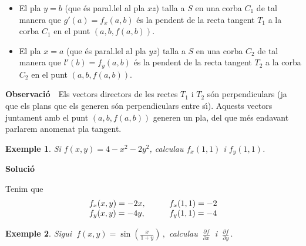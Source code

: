 \documentclass[12pt]{article}
\newcommand{\observacio}{\textbf{Observaci{\'o}}\ \ }
\newcommand{\solucio}{\textbf{Soluci{\'o}}\ \ }
\newtheorem{exemple}{Exemple}[subsection]
\newcommand{\R}{\mathbb{R}}
\begin{document}
\begin{itemize}
\item El pla $y=b$ (que {\'e}s paral.lel al pla $xz$) talla a $S$ en una corba $C_{1}$ de tal  manera que   $g'(a)=f_{x}(a,b)$ {\'e}s la pendent de la recta
tangent $T_{1}$ a la corba $C_{1}$ en el punt $(a,b,f(a,b))$.
\item El pla $x=a$ (que {\'e}s paral.lel al pla $yz$) talla a $S$ en una corba $C_{2}$ de tal  manera que   $l'(b)=f_{y}(a,b)$ {\'e}s la pendent de la recta
tangent $T_{2}$ a la corba $C_{2}$ en el punt $(a,b,f(a,b))$.
\end{itemize}

\vspace{0.4cm}
\observacio Els vectors directors de les rectes $T_{1}$ i $T_{2}$ s{\'o}n perpendiculars (ja que  els plans que els generen
s{\'o}n perpendiculars entre s{\'\i}). Aquests vectors juntament amb el
punt $(a, b, f(a,b))$  generen un pla, del que m{\'e}s endavant
parlarem anomenat pla tangent.



\vspace{0.4cm}
\begin{exemple}
Si $f(x,y)=4-x^{2}-2 y^{2}$, calculau $f_{x}(1,1)$ i $f_{y}(1,1)$.
\end{exemple}

\solucio

Tenim que
\[
\vspace{0.4cm}\begin{array}{lcl}
f_{x}(x,y)=-2x, & \quad & f_{x}(1,1) = -2 \\ f_{y}(x,y)=-4y, &
\quad & f_{y}(1,1) = -4
\end{array}
\]



\vspace{0.4cm}
\begin{exemple}
Sigui $\ f(x,y)=\sin \left(\displaystyle\frac{x}{1+y} \right)\,,$ calculau
$\ \displaystyle\frac{\partial f}{\partial x}\ $ i $\ \displaystyle\frac{\partial f}{\partial y}\,.$
\end{exemple}
\end{document}

